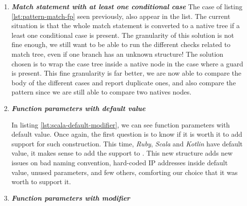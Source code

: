 \begin{enumerate}
	\item \textbf{\textit{Match statement with at least one conditional case}} \newline 
	The case of listing \ref{lst:pattern-match-fp} seen previously, also appear in the list. 
	The current situation is that the whole match statement is converted to a native tree if a least one conditional case is present. 
	The granularity of this solution is not fine enough, we still want to be able to run the different checks related to match tree, even if one branch has an unknown structure!
	The solution chosen is to wrap the case tree inside a native node in the case where a guard is present.
	This fine granularity is far better, we are now able to compare the body of the different cases and report duplicate ones, and also compare the pattern since we are still able to compare two natives nodes.
	
	\item \textbf{\textit{Function parameters with default value}} \newline 
	
	
	In listing \ref{lst:scala-default-modifier}, we can see function parameters with default value. Once again, the first question is to know if it is worth it to add support for such construction. 
	This time, \emph{Ruby}, \emph{Scala} and \emph{Kotlin} have default value, it makes sense to add the support to \slang{}. 
	This new structure adds new issues on bad naming convention, hard-coded IP addresses inside default value, unused parameters, and few others, comforting our choice that it was worth to support it.

	\item \textbf{\textit{Function parameters with modifier}} \newline 
	 
	

\end{enumerate}
